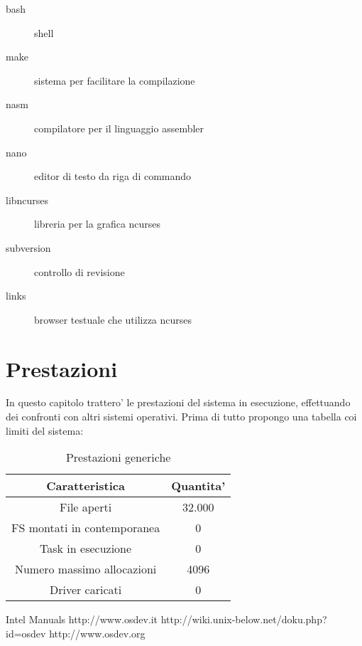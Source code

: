 \documentclass[a4paper,10pt]{book}
\begin{document}
\begin{description}
\item[bash] shell
\item[make] sistema per facilitare la compilazione
\item[nasm] compilatore per il linguaggio assembler
\item[nano] editor di testo da riga di commando
\item[libncurses] libreria per la grafica ncurses
\item[subversion] controllo di revisione
\item[links] browser testuale che utilizza ncurses
\end{description}


\chapter{Prestazioni}
In questo capitolo trattero' le prestazioni del sistema in esecuzione, effettuando dei confronti con altri
sistemi operativi. Prima di tutto propongo una tabella coi limiti del sistema: 

\begin{table}[h]
	\begin{center}
	    \begin{tabular}{ | c | c | }
	    \hline
	    Caratteristica & Quantita' \\ \hline
	    File aperti & 32.000  \\ \hline
	    FS montati in contemporanea & 0 \\ \hline
	    Task in esecuzione & 0   \\ \hline
	    Numero massimo allocazioni & 4096 \\ \hline
	    Driver caricati & 0  \\ \hline	    
	    \end{tabular}
	\end{center}
	\caption{Prestazioni generiche}
	\label{tab:generic_benchmarks}
\end{table}




\begin{thebibliography}{Bibliografia}
	 Intel Manuals
	 http://www.osdev.it
	 http://wiki.unix-below.net/doku.php?id=osdev
	 http://www.osdev.org 
\end{thebibliography}

\appendix
\end{document}
